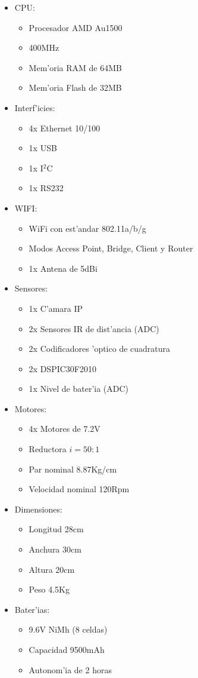 \documentclass[twoside,12pt]{article}
\begin{document}
\begin{multicols}{2}
\begin{itemize}
\item CPU:
	\begin{itemize}
	\item Procesador AMD Au1500
	\item 400MHz
	\item Mem'oria RAM de 64MB
	\item Mem'oria Flash de 32MB
	\end{itemize}
\item Interf'icies:
	\begin{itemize}
	\item 4x Ethernet 10/100
	\item 1x USB
	\item 1x I$^{2}$C %
	\item 1x RS232
	\end{itemize}
\item WIFI:
	\begin{itemize}
	\item WiFi con est'andar 802.11a/b/g
	\item Modos Access Point, Bridge, Client y Router
	\item 1x Antena de 5dBi
	\end{itemize}
\item Sensores:
	\begin{itemize}
	\item 1x C'amara IP
	\item 2x Sensores IR de dist'ancia (ADC)
	\item 2x Codificadores 'optico de cuadratura 
	\item 2x DSPIC30F2010
	\item 1x Nivel de bater'ia (ADC)
	\end{itemize}
\item Motores:
	\begin{itemize}
	\item 4x Motores de 7.2V
	\item Reductora $i=50:1$
	\item Par nominal 8.87Kg/cm
	\item Velocidad nominal 120Rpm
	\end{itemize}
\item Dimensiones:
	\begin{itemize}
	\item Longitud 28cm
	\item Anchura 30cm
	\item Altura 20cm
	\item Peso 4.5Kg
	\end{itemize}
\item Bater'ias:
	\begin{itemize}
	\item 9.6V NiMh (8 celdas)
	\item Capacidad 9500mAh
	\item Autonom'ia de 2 horas
	\end{itemize}
\end{itemize}
\end{multicols}
\end{document}

